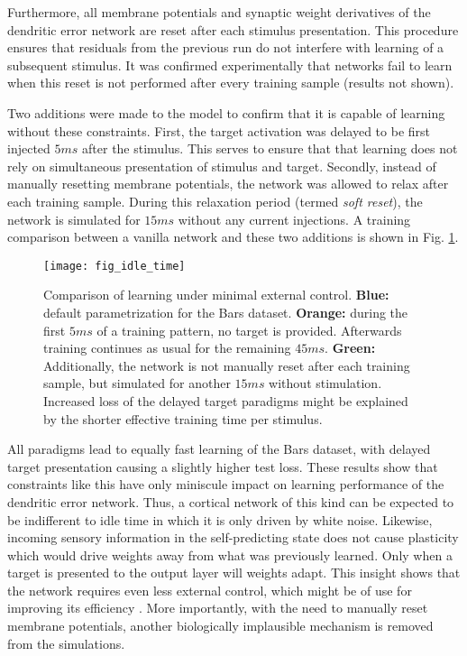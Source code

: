 Furthermore, all membrane potentials and synaptic weight derivatives of the dendritic error network are reset after each
stimulus presentation. This procedure ensures that residuals from the previous run do not interfere with learning of a
subsequent stimulus. It was confirmed experimentally that networks fail to learn when this reset is not performed after
every training sample (results not shown). 

Two additions were made to the model to confirm that it is capable of learning without these constraints. First, the
target activation was delayed to be first injected $5ms$ after the stimulus. This serves to ensure that  that learning
does not rely on simultaneous presentation of stimulus and target. Secondly, instead of manually resetting membrane
potentials, the network was allowed to relax after each training sample. During this relaxation period  (termed
\textit{soft reset}), the network is simulated for $15ms$ without any current injections. A training comparison between
a vanilla network and these two additions is shown in Fig. \ref{fig-idle-time}.


\begin{figure}[h]
    \centering
    \texttt{[image: fig\_idle\_time]}
    \caption{Comparison of learning under minimal external control. \textbf{Blue:} default parametrization for the 
    Bars dataset. \textbf{Orange:} during the first $5ms$ of a training pattern, no target is provided. Afterwards
    training continues as usual for the remaining $45ms$. \textbf{Green:} Additionally, the network is not manually
    reset after each training sample, but simulated for another $15ms$ without stimulation. Increased loss of the 
    delayed target paradigms might be explained by the shorter effective training time per stimulus.}
    \label{fig-idle-time}
\end{figure}

All paradigms lead to equally fast learning of the Bars dataset, with delayed target presentation causing a slightly
higher test loss. These results show that constraints like this have only miniscule impact on learning performance of
the dendritic error network. Thus, a cortical network of this kind can be expected to be indifferent to idle time in
which it is only driven by white noise. Likewise, incoming sensory information in the self-predicting state does not
cause plasticity which would drive weights away from what was previously learned. Only when a target is presented to the
output layer will weights adapt. This insight shows that the network requires even less external control, which might
be of use for improving its efficiency . More importantly, with the need to manually reset membrane 
potentials, another biologically implausible mechanism is removed from the simulations.
